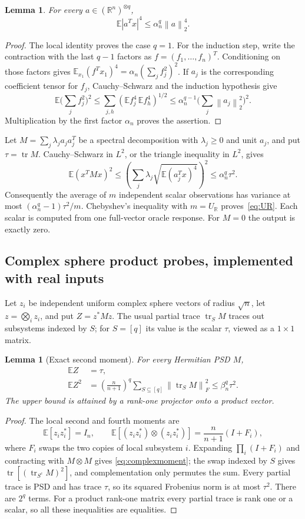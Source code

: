 \documentclass[11pt]{article}
\newtheorem{lemma}[theorem]{Lemma}
\theoremstyle{definition}\newtheorem{definition}[theorem]{Definition}
\theoremstyle{remark}\newtheorem{remark}[theorem]{Remark}
\newcommand{\R}{\mathbb R}\newcommand{\C}{\mathbb C}
\newcommand{\E}{\mathbb E}\newcommand{\PP}{\mathbb P}
\newcommand{\tr}{\operatorname{tr}}\newcommand{\rank}{\operatorname{rank}}
\newcommand{\norm}[1]{\left\lVert#1\right\rVert}
\begin{document}
\begin{lemma}\label{lem:real4}
For every $a\in(\R^n)^{\otimes q}$,
\[
 \E|a^Tx|^4\le\alpha_n^q\norm a_2^4.
\]
\end{lemma}
\begin{proof}
The local identity proves the case $q=1$. For the induction step, write the
contraction with the last $q-1$ factors as $f=(f_1,\ldots,f_n)^T$. Conditioning
on those factors gives $\E_{x_1}(f^Tx_1)^4=\alpha_n(\sum_j f_j^2)^2$.
If $a_j$ is the corresponding coefficient tensor for $f_j$, Cauchy--Schwarz
and the induction hypothesis give
\[
 \E\Big(\sum_j f_j^2\Big)^2
 \le\sum_{j,h}(\E f_j^4\,\E f_h^4)^{1/2}
 \le\alpha_n^{q-1}\Big(\sum_j\norm{a_j}_2^2\Big)^2.
\]
Multiplication by the first factor $\alpha_n$ proves the assertion.
\end{proof}

Let $M=\sum_j\lambda_j a_ja_j^T$ be a spectral decomposition with
$\lambda_j\ge0$ and unit $a_j$, and put $\tau=\tr M$.
Cauchy--Schwarz in $L^2$, or the triangle inequality in $L^2$, gives
\[
 \E(x^TMx)^2
 \le\left(\sum_j\lambda_j\sqrt{\E(a_j^Tx)^4}\right)^2
 \le\alpha_n^q\tau^2.
\]
Consequently the average of $m$ independent scalar observations has variance
at most $(\alpha_n^q-1)\tau^2/m$. Chebyshev's inequality with
$m=U_{\R}$ proves~\eqref{eq:UR}. Each scalar is computed from one full-vector
oracle response. For $M=0$ the output is exactly zero.

\subsection{Complex sphere product probes, implemented with real inputs}
Let $z_i$ be independent uniform complex sphere vectors of radius $\sqrt n$,
let $z=\bigotimes_i z_i$, and put $Z=z^*Mz$. The usual partial trace
$\tr_S M$ traces out subsystems indexed by $S$; for $S=[q]$ its value is the
scalar $\tau$, viewed as a $1\times1$ matrix.

\begin{lemma}[Exact second moment]\label{lem:complexmoment}
For every Hermitian PSD $M$,
\begin{align}
 \E Z&=\tau,\\
 \E Z^2&=\left(\frac n{n+1}\right)^q
       \sum_{S\subseteq[q]}\norm{\tr_S M}_F^2
       \le\beta_n^q\tau^2.
 \label{eq:complexmoment}
\end{align}
The upper bound is attained by a rank-one projector onto a product vector.
\end{lemma}
\begin{proof}
The local second and fourth moments are
\[
 \E[z_i z_i^*]=I_n,\qquad
 \E[(z_i z_i^*)\otimes(z_i z_i^*)]
       =\frac n{n+1}(I+F_i),
\]
where $F_i$ swaps the two copies of local subsystem $i$.
Expanding $\prod_i(I+F_i)$ and contracting with $M\otimes M$ gives
\eqref{eq:complexmoment}; the swap indexed by $S$ gives
$\tr[(\tr_{S^c}M)^2]$, and complementation only permutes the sum.
Every partial trace is PSD and has trace $\tau$, so its squared Frobenius norm
is at most $\tau^2$. There are $2^q$ terms. For a product rank-one matrix every
partial trace is rank one or a scalar, so all these inequalities are equalities.
\end{proof}
\end{document}
